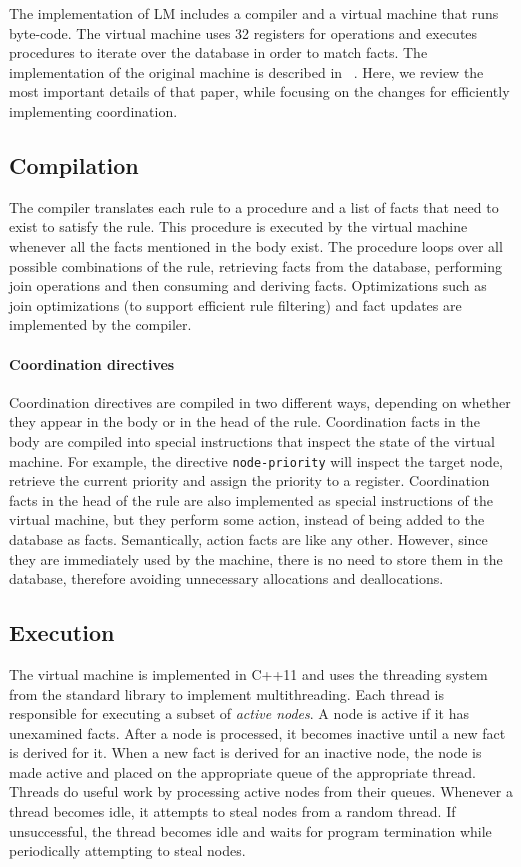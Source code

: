 The implementation of LM includes a compiler and a virtual machine that runs
byte-code. The virtual machine uses 32 registers for
operations and executes procedures to iterate over the database in order to match facts.
The implementation of the original machine is described in ~\cite{cruz-ppdp14}.
Here, we review the most important details of that paper, while focusing on the
changes for efficiently implementing coordination.

\subsection{Compilation}

The compiler translates each rule to a procedure and a list of facts that need
to exist to satisfy the rule. This procedure is executed by the virtual
machine whenever all the facts mentioned in the body exist.
The procedure loops over all possible combinations of the rule, retrieving facts from the
database, performing join operations and then consuming and deriving facts.
Optimizations such as join optimizations (to support efficient rule filtering)
and fact updates are implemented by the compiler.

\paragraph{Coordination directives}
Coordination directives are compiled in two different ways, depending on whether they
appear in the body or in the head of the rule. Coordination facts in the body
are compiled into special instructions that inspect the state of the virtual
machine. For example, the directive \texttt{node-priority} will inspect the
target node, retrieve the current priority and assign the priority to a
register. Coordination facts in the head of the rule are also implemented as
special instructions of the virtual machine, but they perform some action,
instead of being added to the database as facts.
Semantically, action facts are like any other. However, since they are
immediately used by the machine, there is no need to store them in the
database, therefore avoiding unnecessary allocations and deallocations.

\subsection{Execution}

The virtual machine is implemented in C++11 and uses the threading system from
the standard library to implement multithreading. Each thread is responsible for
executing a subset of \emph{active nodes}. A node is active if it has unexamined
facts. After a node is processed, it becomes inactive until a new fact is
derived for it. When a new fact is derived for an
inactive node, the node is made active and placed on the appropriate queue of
the appropriate thread.  Threads do useful work by processing active nodes from their queues. Whenever a
thread becomes idle, it attempts to steal nodes from a random thread.
If unsuccessful, the thread becomes idle and waits for program
termination while periodically attempting to steal nodes.

